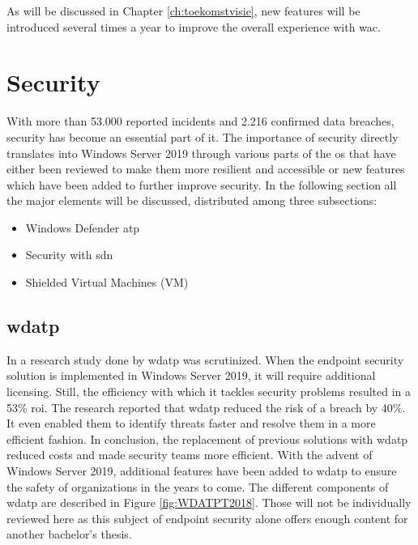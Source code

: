 As will be discussed in Chapter \ref{ch:toekomstvisie}, new features will be introduced several times a year to improve the overall experience with \acrlong{wac}.

\clearpage

\section{Security}
With more than 53.000 reported incidents and 2.216 confirmed data breaches, security has become an essential part of \acrshort{it}. \autocite{Verizon2018}
The importance of security directly translates into Windows Server 2019 through various parts of the \acrshort{os} that have either been reviewed to make them more resilient and accessible or new features which have been added to further improve security. 
In the following section all the major elements will be discussed, distributed among three subsections:
\begin{itemize}
	\item Windows Defender \acrfull{atp}
	\item Security with \acrfull{sdn}
	\item Shielded Virtual Machines (VM)
\end{itemize}

\subsection{\acrfull{wdatp}}
In a research study done by \textcite{Musto2017} \acrshort{wdatp} was scrutinized. 
When the endpoint security solution is implemented in Windows Server 2019, it will require additional licensing. 
Still, the efficiency with which it tackles security problems resulted in a 53\% \acrfull{roi}. 
The research reported that \acrshort{wdatp} reduced the risk of a breach by 40\%. 
It even enabled them to identify threats faster and resolve them in a more efficient fashion. 
In conclusion, the replacement of previous solutions with \acrshort{wdatp} reduced costs and made security teams more efficient. 
With the advent of Windows Server 2019, additional features have been added to \acrshort{wdatp} to ensure the safety of organizations in the years to come. 
The different components of \acrshort{wdatp} are described in Figure \ref{fig:WDATPT2018}. 
Those will not be individually reviewed here as this subject of endpoint security alone offers enough content for another bachelor's thesis.

